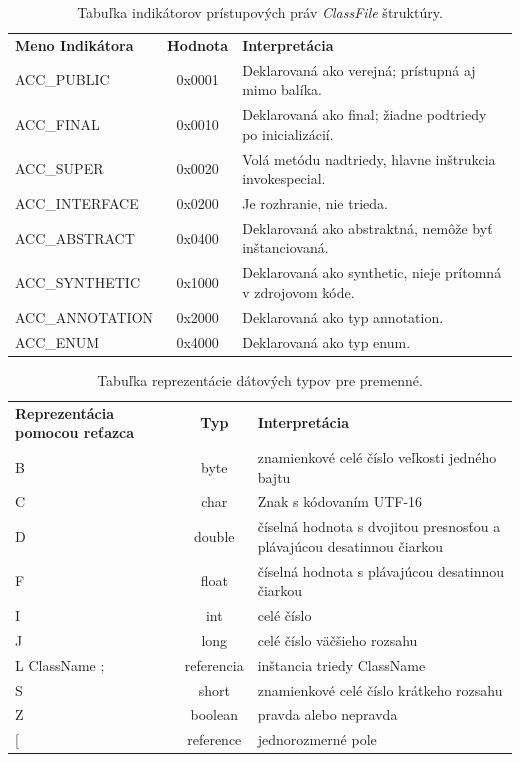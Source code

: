 \documentclass[11pt,final,oneside]{fithesis}
\begin{document}
\begin{table}
  \begin{tabular}{| l | c | p{6cm} |}
    \hline
    \textbf{Meno Indikátora} & \textbf{Hodnota} & \textbf{Interpretácia} \\
    \hhline{|=|=|=|}
    ACC\_PUBLIC & 0x0001 & Deklarovaná ako verejná; prístupná aj mimo balíka.
    \\ \hline
    ACC\_FINAL & 0x0010 & Deklarovaná ako final; žiadne podtriedy po 
    inicializácií. \\ \hline
    ACC\_SUPER & 0x0020 & Volá metódu nadtriedy, hlavne inštrukcia 
    invokespecial. \\ \hline
    ACC\_INTERFACE & 0x0200 & Je rozhranie, nie trieda.\\ \hline
    ACC\_ABSTRACT & 0x0400 & Deklarovaná ako abstraktná, nemôže byť 
    inštanciovaná. \\ \hline
    ACC\_SYNTHETIC & 0x1000 & Deklarovaná ako synthetic, nieje prítomná v 
    zdrojovom kóde. \\ \hline
    ACC\_ANNOTATION & 0x2000 & Deklarovaná ako typ annotation. \\ \hline
    ACC\_ENUM & 0x4000 & Deklarovaná ako typ enum. \\    
    \hline
  \end{tabular}
  \caption{Tabuľka indikátorov prístupových práv \textit{ClassFile} štruktúry.}
  \label{tab:tab2}
\end{table}

\begin{table}
  \begin{tabular}{| p{3cm} | c | p{} |}
    \hline
    \textbf{Reprezentácia pomocou reťazca} & \textbf{Typ} & 
    \textbf{Interpretácia} \\
    \hhline{|=|=|=|}
     B & byte &  znamienkové celé číslo veľkosti jedného bajtu \\ \hline
     C & char & Znak s kódovaním UTF-16 \\ \hline
     D & double & číselná hodnota s dvojitou presnosťou a plávajúcou
     desatinnou čiarkou \\ \hline
     F & float & číselná hodnota s plávajúcou desatinnou čiarkou \\ \hline
     I & int & celé číslo \\ \hline
     J & long & celé číslo väčšieho rozsahu \\ \hline
     L ClassName ; & referencia & inštancia triedy ClassName \\ \hline
     S & short & znamienkové celé číslo krátkeho rozsahu \\ \hline
     Z & boolean & pravda alebo nepravda \\ \hline
     [ & reference & jednorozmerné pole \\
    \hline
  \end{tabular}
  \caption{Tabuľka reprezentácie dátových typov pre premenné.}
  \label{tab:tab3}
\end{table}
\end{document}
